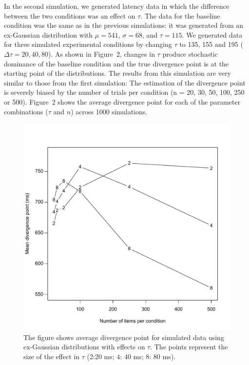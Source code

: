 \documentclass{article}
\begin{document}
      In the second simulation, we generated latency data in which the difference between the two conditions was an effect on $\tau$.  The data for the baseline condition was the same as in the previous simulations: it was generated from an ex-Gaussian distribution with $\mu= 541$, $\sigma = 68$, and $\tau = 115$.  We generated data for three simulated experimental conditions by changing $\tau$ to 135, 155 and 195  ($\Delta \tau = 20, 40, 80$). As shown in Figure~2, changes in $\tau$  produce stochastic dominance of the baseline condition and the true divergence point is at the starting point of the distributions.   The results from this simulation are very similar to those from the first simulation: The estimation of the divergence point is severely biased by the number of trials per condition (n = 20, 30, 50, 100, 250 or 500).   Figure~2 shows the average divergence point for each of the parameter combinations ($\tau$ and $n$) across 1000 simulations.
   
\begin{figure}[h] %
	\includegraphics[width=5in]{Figure6.pdf}
	\caption{The figure shows average divergence point for simulated data using ex-Gaussian distributions with effects on $\tau$. The points represent the size of the effect in $\tau$ ($2$:20 ms; $4$: 40 ms; $8$: 80 ms).}
	\label{fig:tau-div}
\end{figure}
\end{document}
